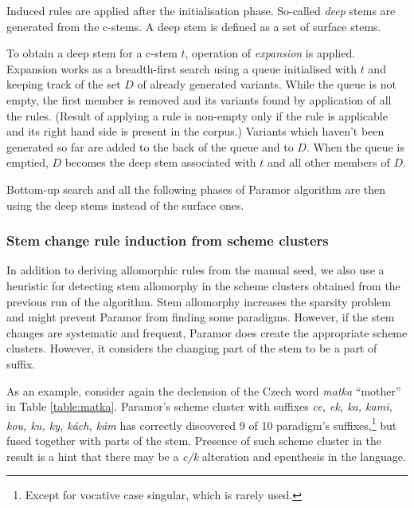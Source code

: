 \documentclass{itatnew}
\newcommand{\gloss}[2]{\emph{#1} ``#2''}
\newcommand{\e}[1]{\textit{#1}} %
\newcommand{\todojd}[1]{} %
\begin{document}
\noindent
Induced rules are applied after the initialisation phase. So-called \emph{deep} stems are generated from the c-stems. A deep stem is defined as a set of surface stems.

To obtain a deep stem for a c-stem $t$, operation of \emph{expansion} is applied. Expansion works as a breadth-first search using a queue initialised with $t$ and keeping track of the set $D$ of already generated variants. While the queue is not empty, the first member is removed and its variants found by application of all the rules. (Result of applying a rule is non-empty only if the rule is applicable and its right hand side is present in the corpus.) Variants which haven't been generated so far are added to the back of the queue and to $D$. When the queue is emptied, $D$ becomes the deep stem associated with $t$ and all other members of $D$. \todojd{Any reason why? Why not keep the deep stem ambiguous? This roughly means that rules are obligatory (If I can produce another allomorph, I have to). Some example, possibly mention where it helps and where it hurts. \textbf{RK:} No special reason for that. I may try an experiment where i keep the `surface' stems }

Bottom-up search and all the following phases of Paramor algorithm are then using the deep stems instead of the surface ones.

\subsubsection{Stem change rule induction from scheme clusters}
\label{sec:autoseed}

\noindent
In addition to deriving allomorphic rules from the manual seed, we also use a heuristic for detecting stem allomorphy in the scheme clusters obtained from the previous run of the algorithm.
%
Stem allomorphy increases the sparsity problem and might prevent Paramor from finding some paradigms. However, if the stem changes are systematic and frequent, Paramor does create the appropriate scheme clusters. However, it considers the changing part of the stem to be a part of suffix.

As an example, consider again the declension of the Czech word \gloss{matka}{mother} in Table \ref{table:matka}. Paramor's scheme cluster with suffixes \emph{ce, ek, ka, kami, kou, ku, ky, kách, kám} has correctly discovered 9 of 10 paradigm's suffixes,\footnote{Except for vocative case singular, which is rarely used.} but fused together with parts of the stem.
Presence of such scheme cluster in the result is a hint that there may be a \e{c/k} alteration and epenthesis in the language.
\end{document}
